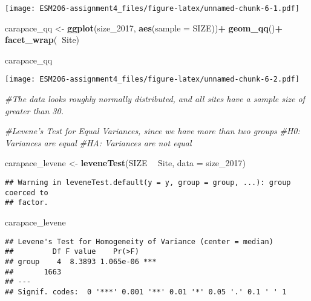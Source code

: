\documentclass[]{article}
\newenvironment{Shaded}{\begin{snugshade}}{\end{snugshade}}
\newcommand{\KeywordTok}[1]{\textcolor[rgb]{0.13,0.29,0.53}{\textbf{#1}}}
\newcommand{\DataTypeTok}[1]{\textcolor[rgb]{0.13,0.29,0.53}{#1}}
\newcommand{\DecValTok}[1]{\textcolor[rgb]{0.00,0.00,0.81}{#1}}
\newcommand{\StringTok}[1]{\textcolor[rgb]{0.31,0.60,0.02}{#1}}
\newcommand{\CommentTok}[1]{\textcolor[rgb]{0.56,0.35,0.01}{\textit{#1}}}
\newcommand{\OperatorTok}[1]{\textcolor[rgb]{0.81,0.36,0.00}{\textbf{#1}}}
\newcommand{\NormalTok}[1]{#1}
\begin{document}
\texttt{[image: ESM206-assignment4\_files/figure-latex/unnamed-chunk-6-1.pdf]}

\begin{Shaded}
\begin{Highlighting}[]
\NormalTok{carapace_qq <-}\StringTok{ }\KeywordTok{ggplot}\NormalTok{(size_}\DecValTok{2017}\NormalTok{, }\KeywordTok{aes}\NormalTok{(}\DataTypeTok{sample =}\NormalTok{ SIZE))}\OperatorTok{+}
\StringTok{  }\KeywordTok{geom_qq}\NormalTok{()}\OperatorTok{+}
\StringTok{  }\KeywordTok{facet_wrap}\NormalTok{(}\OperatorTok{~}\NormalTok{Site)}

\NormalTok{carapace_qq}
\end{Highlighting}
\end{Shaded}

\texttt{[image: ESM206-assignment4\_files/figure-latex/unnamed-chunk-6-2.pdf]}

\begin{Shaded}
\begin{Highlighting}[]
\CommentTok{#The data looks roughly normally distributed, and all sites have a sample size of greater than 30. }
\end{Highlighting}
\end{Shaded}

\begin{Shaded}
\begin{Highlighting}[]
\CommentTok{#Levene's Test for Equal Variances, since we have more than two groups}
\CommentTok{#H0: Variances are equal}
\CommentTok{#HA: Variances are not equal}

\NormalTok{carapace_levene <-}\StringTok{ }\KeywordTok{leveneTest}\NormalTok{(SIZE }\OperatorTok{~}\StringTok{ }\NormalTok{Site, }\DataTypeTok{data =}\NormalTok{ size_}\DecValTok{2017}\NormalTok{)}
\end{Highlighting}
\end{Shaded}

\begin{verbatim}
## Warning in leveneTest.default(y = y, group = group, ...): group coerced to
## factor.
\end{verbatim}

\begin{Shaded}
\begin{Highlighting}[]
\NormalTok{carapace_levene}
\end{Highlighting}
\end{Shaded}

\begin{verbatim}
## Levene's Test for Homogeneity of Variance (center = median)
##         Df F value    Pr(>F)    
## group    4  8.3893 1.065e-06 ***
##       1663                      
## ---
## Signif. codes:  0 '***' 0.001 '**' 0.01 '*' 0.05 '.' 0.1 ' ' 1
\end{verbatim}
\end{document}
